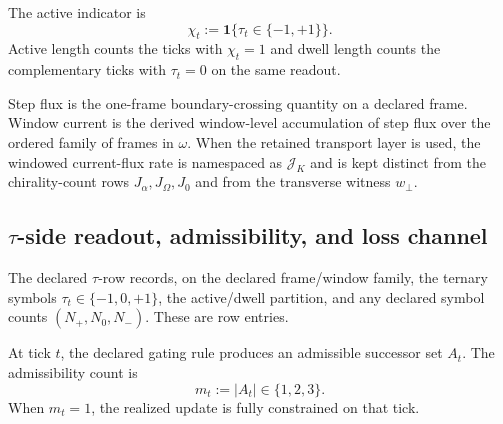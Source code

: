 \begin{definition}
\label{def:active-dwell}
The active indicator is
\[
\chi_t:=\mathbf{1}\{\tau_t\in\{-1,+1\}\}.
\]
Active length counts the ticks with $\chi_t=1$ and dwell length counts the complementary ticks with $\tau_t=0$ on the same readout.
\end{definition}

\begin{definition}
\label{def:step-window-current}
Step flux is the one-frame boundary-crossing quantity on a declared frame. Window current is the derived window-level accumulation of step flux over the ordered family of frames in $\omega$. When the retained transport layer is used, the windowed current-flux rate is namespaced as $\mathcal J_K$ and is kept distinct from the chirality-count rows $J_\alpha,J_\Omega,J_0$ and from the transverse witness $w_\perp$.
\end{definition}

\subsection{\texorpdfstring{$\tau$}{tau}-side readout, admissibility, and loss channel}
\begin{definition}
\label{def:tau-readout-record}
The declared $\tau$-row records, on the declared frame/window family, the ternary symbols $\tau_t\in\{-1,0,+1\}$, the active/dwell partition, and any declared symbol counts $(N_+,N_0,N_-)$. These are row entries.
\end{definition}

\begin{definition}
\label{def:mt}
At tick $t$, the declared gating rule produces an admissible successor set $A_t$. The admissibility count is
\[
m_t:=|A_t|\in\{1,2,3\}.
\]
When $m_t=1$, the realized update is fully constrained on that tick.
\end{definition}

